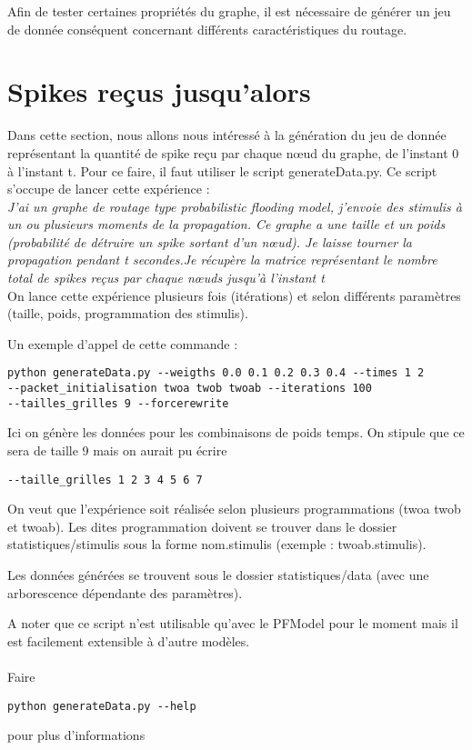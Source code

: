\documentclass{report}
\begin{document}
Afin de tester certaines propriétés du graphe, il est nécessaire de générer un jeu de donnée conséquent concernant différents caractéristiques du routage.

\section{Spikes reçus jusqu'alors}

Dans cette section, nous allons nous intéressé à la génération du jeu de donnée représentant la quantité de spike reçu par chaque nœud du graphe, de l'instant 0 à l'instant t.
Pour ce faire, il faut utiliser le script generateData.py.
Ce script s'occupe de lancer cette expérience :\\

\textit{J'ai un graphe de routage type probabilistic flooding model, j'envoie des stimulis à un ou plusieurs moments de la propagation. Ce graphe a une taille et un poids (probabilité de détruire un spike sortant d'un nœud). Je laisse tourner la propagation pendant t secondes.Je récupère la matrice représentant le nombre total de spikes reçus par chaque nœuds jusqu'à l'instant t}\\

On lance cette expérience plusieurs fois (itérations) et selon différents paramètres (taille, poids, programmation des stimulis).

Un exemple d'appel de cette commande :
\begin{verbatim}
python generateData.py --weigths 0.0 0.1 0.2 0.3 0.4 --times 1 2 
--packet_initialisation twoa twob twoab --iterations 100 
--tailles_grilles 9 --forcerewrite
\end{verbatim}

Ici on génère les données pour les combinaisons de poids temps. On stipule que ce sera de 
taille 9 mais on aurait pu écrire 
\begin{verbatim} 
--taille_grilles 1 2 3 4 5 6 7
\end{verbatim}


On veut que l'expérience soit réalisée selon plusieurs programmations (twoa twob et twoab). Les dites programmation doivent se trouver dans le dossier statistiques/stimulis sous la forme nom.stimulis (exemple : twoab.stimulis).

Les données générées se trouvent sous le dossier statistiques/data (avec une arborescence dépendante des paramètres).

A noter que ce script n'est utilisable qu'avec le PFModel pour le moment mais il est facilement extensible à d'autre modèles.\\\\
Faire
\begin{verbatim}
python generateData.py --help
\end{verbatim}
pour plus d'informations
\end{document}

